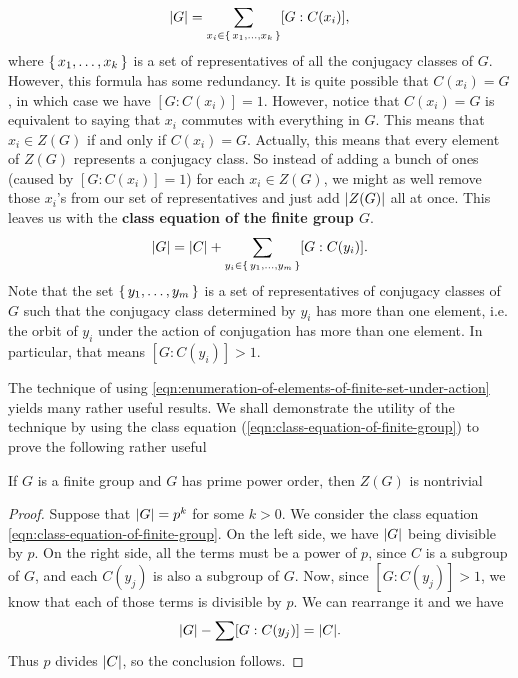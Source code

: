 \documentclass[./main.tex]{subfiles}
\begin{document}
\begin{equation}
\label{eqn:midpoint-class-equation-of-finite-group}
    \abs G = \sum_{x_i \in \set{x_1, \dots, x_k}} [G:C(x_i)],
\end{equation}
where $\set{x_1, \dots, x_k}$ is a set of representatives of all the conjugacy
classes of $G$. However, this formula has some redundancy. It is quite possible
that $C(x_i) = G$, in which case we have $[G:C(x_i)] = 1$. However, notice that
$C(x_i) = G$ is equivalent to saying that $x_i$ commutes with everything in $G$.
This means that $x_i \in Z(G)$ if and only if $C(x_i) = G$. Actually, this means
that every element of $Z(G)$ represents a conjugacy class. So instead of adding
a bunch of ones (caused by $[G:C(x_i)] = 1$) for each $x_i \in Z(G)$, we might
as well remove those $x_i$'s from our set of representatives and just add
$\abs{Z(G)}$ all at once. This leaves us with the \textbf{class equation of the
finite group $G$}.
\begin{equation}
\label{eqn:class-equation-of-finite-group}
\abs G = \abs C + \sum_{y_i \in \set{y_1, \dots, y_m}} [G:C(y_i)].
\end{equation}
Note that the set $\set{y_1, \dots, y_m}$ is a set of representatives of
conjugacy classes of $G$ such that the conjugacy class determined by $y_i$ has
more than one element, i.e. the orbit of $y_i$ under the action of conjugation
has more than one element. In particular, that means $[G:C(y_i)] > 1$.

The technique of using
\cref{eqn:enumeration-of-elements-of-finite-set-under-action} yields many rather
useful results. We shall demonstrate the utility of the technique by using the class equation (\cref{eqn:class-equation-of-finite-group}) to prove the following rather useful
\begin{proposition}
    If $G$ is a finite group and $G$ has prime power order, then $Z(G)$ is nontrivial
\end{proposition}
\begin{proof}
    Suppose that $\abs G = p^k$ for some $k > 0$. We consider the class equation
    \cref{eqn:class-equation-of-finite-group}. On the left side, we have $\abs
    G$ being divisible by $p$. On the right side, all the terms must be a power
    of $p$, since $C$ is a subgroup of $G$, and each $C(y_j)$ is also a subgroup
    of $G$. Now, since $[G:C(y_j)] > 1$, we know that each of those terms is
    divisible by $p$. We can rearrange it and we have 
    \[
        \abs G - \sum [G:C(y_j)] = \abs C.
    \]
    Thus $p$ divides $\abs C$, so the conclusion follows.
\end{proof}
\end{document}
